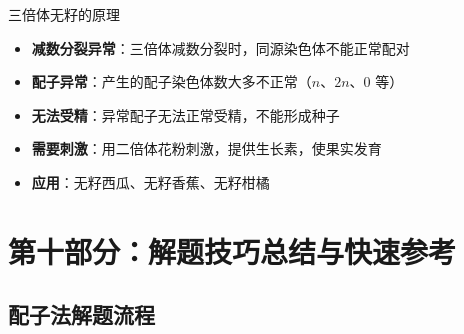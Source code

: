 \documentclass[a4paper,11pt]{ctexart}
\begin{document}
\begin{lemmabox}{三倍体无籽的原理}
\begin{itemize}[leftmargin=2em]
    \item \textbf{减数分裂异常}：三倍体减数分裂时，同源染色体不能正常配对
    \item \textbf{配子异常}：产生的配子染色体数大多不正常（$n$、$2n$、$0$ 等）
    \item \textbf{无法受精}：异常配子无法正常受精，不能形成种子
    \item \textbf{需要刺激}：用二倍体花粉刺激，提供生长素，使果实发育
    \item \textbf{应用}：无籽西瓜、无籽香蕉、无籽柑橘
\end{itemize}
\end{lemmabox}


\section{第十部分：解题技巧总结与快速参考}

\subsection{配子法解题流程}
\end{document}

